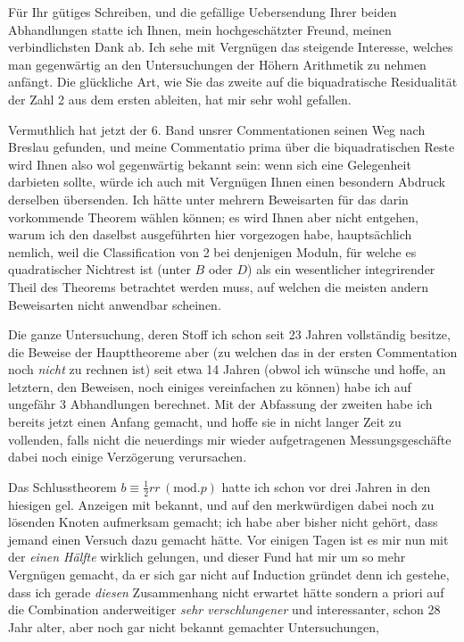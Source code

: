 \clearpage{}
Für Ihr gütiges Schreiben, und die gefällige Uebersendung Ihrer beiden Abhandlungen statte ich Ihnen, mein hochgeschätzter Freund, meinen verbindlichsten Dank ab. Ich sehe mit Vergnügen das steigende Interesse, welches man gegenwärtig an den Untersuchungen der Höhern Arithmetik zu nehmen anfängt. Die glückliche Art, wie Sie das zweite auf die biquadratische Residualität der Zahl 2 aus dem ersten ableiten, hat mir sehr wohl gefallen.
\par Vermuthlich hat jetzt der 6. Band unsrer Commentationen seinen Weg nach Breslau gefunden, und meine Commentatio prima über die biquadratischen Reste wird Ihnen also wol gegenwärtig bekannt sein: wenn sich eine Gelegenheit darbieten sollte, würde ich auch mit Vergnügen Ihnen einen besondern Abdruck derselben übersenden. Ich hätte unter mehrern Beweisarten für das darin vorkommende Theorem wählen können; es wird Ihnen aber nicht entgehen, warum ich den daselbst ausgeführten hier vorgezogen habe, hauptsächlich nemlich, weil die Classification von 2 bei denjenigen Moduln, für welche es quadratischer Nichtrest ist (unter $B$ oder $D$) als ein wesentlicher integrirender Theil des Theorems betrachtet werden muss, auf welchen die meisten andern Beweisarten nicht anwendbar scheinen.
\par Die ganze Untersuchung, deren Stoff ich schon seit 23 Jahren vollständig besitze, die Beweise der Haupttheoreme aber (zu welchen das in der ersten Commentation noch \textit{nicht} zu rechnen ist) seit etwa 14 Jahren \textemdash{} (obwol ich wünsche und hoffe, an letztern, den Beweisen, noch einiges vereinfachen zu können) \textemdash{} habe ich auf ungefähr 3 Abhandlungen berechnet. Mit der Abfassung der zweiten habe ich bereits jetzt einen Anfang gemacht, und hoffe sie in nicht langer Zeit zu vollenden, falls nicht die neuerdings mir wieder aufgetragenen Messungsgeschäfte dabei noch einige Verzögerung verursachen.
\par Das Schlusstheorem $b\equiv\frac12rr\, (\mathrm{mod}.p)$ hatte ich schon vor drei Jahren in den hiesigen gel. Anzeigen mit bekannt, und auf den merkwürdigen dabei noch zu lösenden Knoten aufmerksam gemacht; ich habe aber bisher nicht gehört, dass jemand einen Versuch dazu gemacht hätte. Vor einigen Tagen ist es mir nun mit der \textit{einen Hälfte} wirklich gelungen, und dieser Fund hat mir um so mehr Vergnügen gemacht, da er sich gar nicht auf Induction gründet \textemdash{} denn ich gestehe, dass ich gerade \textit{diesen} Zusammenhang nicht erwartet hätte \textemdash{} sondern a priori auf die Combination anderweitiger \textit{sehr verschlungener} und interessanter, schon 28 Jahr alter, aber noch gar nicht bekannt gemachter Untersuchungen,

